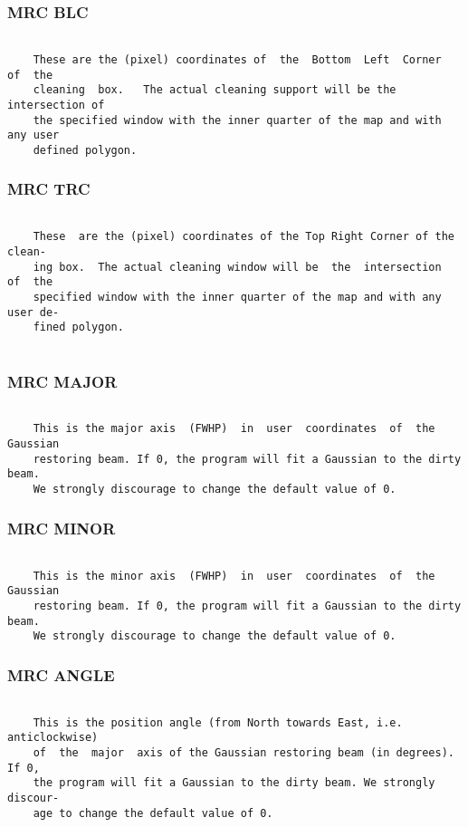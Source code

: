 \subsubsection{MRC BLC}
\begin{verbatim}

    These are the (pixel) coordinates of  the  Bottom  Left  Corner  of  the
    cleaning  box.   The actual cleaning support will be the intersection of
    the specified window with the inner quarter of the map and with any user
    defined polygon.

\end{verbatim}
\subsubsection{MRC TRC}
\begin{verbatim}

    These  are the (pixel) coordinates of the Top Right Corner of the clean-
    ing box.  The actual cleaning window will be  the  intersection  of  the
    specified window with the inner quarter of the map and with any user de-
    fined polygon.


\end{verbatim}
\subsubsection{MRC MAJOR}
\begin{verbatim}

    This is the major axis  (FWHP)  in  user  coordinates  of  the  Gaussian
    restoring beam. If 0, the program will fit a Gaussian to the dirty beam.
    We strongly discourage to change the default value of 0.

\end{verbatim}
\subsubsection{MRC MINOR}
\begin{verbatim}

    This is the minor axis  (FWHP)  in  user  coordinates  of  the  Gaussian
    restoring beam. If 0, the program will fit a Gaussian to the dirty beam.
    We strongly discourage to change the default value of 0.

\end{verbatim}
\subsubsection{MRC ANGLE}
\begin{verbatim}

    This is the position angle (from North towards East, i.e. anticlockwise)
    of  the  major  axis of the Gaussian restoring beam (in degrees).  If 0,
    the program will fit a Gaussian to the dirty beam. We strongly  discour-
    age to change the default value of 0.

\end{verbatim}
